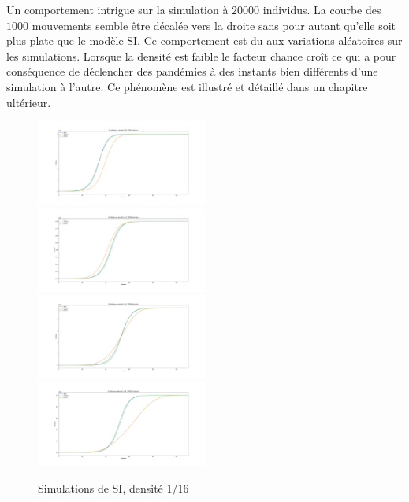 Un comportement intrigue sur la simulation à $20000$ individus. La courbe des $1000$ mouvements semble être décalée vers la droite sans pour autant qu'elle soit plus plate que le modèle SI. Ce comportement est du aux variations aléatoires sur les simulations. Lorsque la densité est faible le facteur chance croît ce qui a pour conséquence de déclencher des pandémies à des instants bien différents d'une simulation à l'autre. Ce phénomène est illustré et détaillé dans un chapitre ultérieur.

\newpage

\begin{figure}
    \centering
    \captionsetup{justification=centering}
    \includegraphics[width=0.5\textwidth]{Images/SI_ref_16_5k.pdf}
    \includegraphics[width=0.5\textwidth]{Images/SI_ref_16_20k.pdf}
    \includegraphics[width=0.5\textwidth]{Images/SI_ref_16_50k.pdf}
    \includegraphics[width=0.5\textwidth]{Images/SI_ref_16_100k.pdf}
    \caption{Simulations de SI, densité 1/16}
\end{figure}

